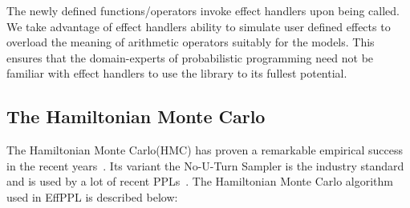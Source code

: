 \documentclass[a4paper,11pt]{article}
\theoremstyle{mytheor}
\begin{document}
    The newly defined functions/operators invoke effect handlers upon being called. We take advantage of effect handlers ability to simulate user defined effects to overload the meaning of arithmetic operators suitably for the models. This ensures that the domain-experts of probabilistic programming need not be familiar with effect handlers to use the library to its fullest potential.
    
    
    \subsection{The Hamiltonian Monte Carlo}

    The Hamiltonian Monte Carlo(HMC) has proven a remarkable empirical success in the recent years~\cite{betancourt2018conceptual}. Its variant the No-U-Turn Sampler is the industry standard and is used by a lot of recent PPLs~\cite{stan,pyro,tran2017deep}. The Hamiltonian Monte Carlo algorithm~\cite{hoffman2011nouturn} used in EffPPL is described below: \\
    
\end{document}
